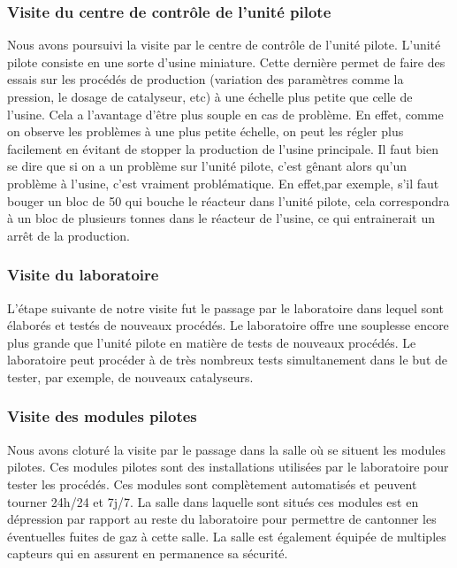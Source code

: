 \subsubsection{Visite du centre de contrôle de l'unité pilote}
Nous avons poursuivi la visite par le centre de contrôle de l'unité pilote. L'unité pilote consiste en une sorte d'usine miniature. Cette dernière permet de faire des essais sur les procédés de production (variation des paramètres comme la pression, le dosage de catalyseur, etc) à une échelle plus petite que celle de l'usine. Cela a l'avantage d'être plus souple en cas de problème. En effet, comme on observe les problèmes à une plus petite échelle, on peut les régler plus facilement en évitant de stopper la production de l'usine principale. Il faut bien se dire que si on a un problème sur l'unité pilote, c'est gênant alors qu'un problème à l'usine, c'est vraiment problématique. En effet,par exemple, s'il faut bouger un bloc de \unit{50}{\kilo \gram} qui bouche le réacteur dans l'unité pilote, cela correspondra à un bloc de plusieurs tonnes dans le réacteur de l'usine, ce qui entrainerait un arrêt de la production.

\subsubsection{Visite du laboratoire}
L'étape suivante de notre visite fut le passage par le laboratoire dans lequel sont élaborés et testés de nouveaux procédés. Le laboratoire offre une souplesse encore plus grande que l'unité pilote en matière de tests de nouveaux procédés. Le laboratoire peut procéder à de très nombreux tests simultanement dans le but de tester, par exemple, de nouveaux catalyseurs.

\subsubsection{Visite des modules pilotes}
Nous avons cloturé la visite par le passage dans la salle où se situent les modules pilotes. Ces modules pilotes sont des installations utilisées par le laboratoire pour tester les procédés. Ces modules sont complètement automatisés et peuvent tourner 24h/24 et 7j/7. La salle dans laquelle sont situés ces modules est en dépression par rapport au reste du laboratoire pour permettre de cantonner les éventuelles fuites de gaz à cette salle. La salle est également équipée de multiples capteurs qui en assurent en permanence sa sécurité.

